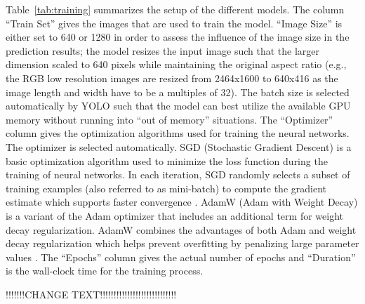 \documentclass[Master,MDS,english]{BASE/twbook} %
\begin{document}
Table~\ref{tab:training} summarizes the setup of the different models. The column ``Train Set'' gives the images that are used to train the model. ``Image Size'' is either set to 640 or 1280 in order to assess the influence of the image size in the prediction results; the model resizes the input image such that the larger dimension scaled to 640 pixels while maintaining the original aspect ratio (e.g., the RGB low resolution images are resized from 2464x1600 to 640x416 as the image length and width have to be a multiples of 32).
The batch size is selected automatically by YOLO such that the model can best utilize the available GPU memory without running into ``out of memory'' situations. The ``Optimizer'' column gives the optimization algorithms used for training the neural networks. The optimizer is selected automatically.  SGD (Stochastic Gradient Descent) is a basic optimization algorithm used to minimize the loss function during the training of neural networks. In each iteration, SGD randomly selects a subset of training examples (also referred to as mini-batch) to compute the gradient estimate which supports faster convergence \citep{bottou2010large}. AdamW (Adam with Weight Decay) is a variant of the Adam optimizer that includes an additional term for weight decay regularization. AdamW combines the advantages of both Adam and weight decay regularization which helps prevent overfitting by penalizing large parameter values \citep{kingma2014adam}. 
The ``Epochs'' column gives the actual number of epochs and ``Duration'' is the wall-clock time for the training process. 
 
 
 
 !!!!!!!CHANGE TEXT!!!!!!!!!!!!!!!!!!!!!!!!!!!!
 
 
 
\end{document}
